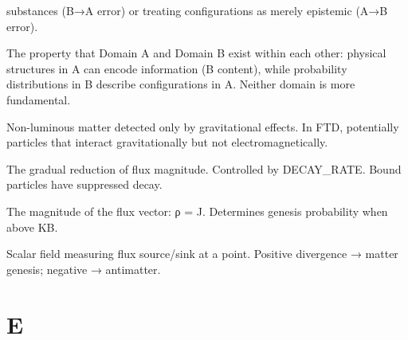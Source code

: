 \documentclass[
  11pt,
  letterpaper,
  twoside,
  openany]{book}
\makeatletter
\let\orig@section\section
\renewcommand{\section}{\needspace{8\baselineskip}\orig@section}
\makeatother
\begin{document}
\begin{description}
substances (B→A error) or treating configurations as merely epistemic
(A→B error).
\item[\textbf{Domain Interpenetration}]
The property that Domain A and Domain B exist within each other:
physical structures in A can encode information (B content), while
probability distributions in B describe configurations in A. Neither
domain is more fundamental.
\item[\textbf{Dark Matter}]
Non-luminous matter detected only by gravitational effects. In FTD,
potentially particles that interact gravitationally but not
electromagnetically.
\item[\textbf{Decay}]
The gradual reduction of flux magnitude. Controlled by DECAY\_RATE.
Bound particles have suppressed decay.
\item[\textbf{Density}]
The magnitude of the flux vector: ρ = \textbar J\textbar. Determines
genesis probability when above KB.
\item[\textbf{Divergence}]
Scalar field measuring flux source/sink at a point. Positive divergence
→ matter genesis; negative → antimatter.
\end{description}

\section{E}\label{e}
\end{document}
